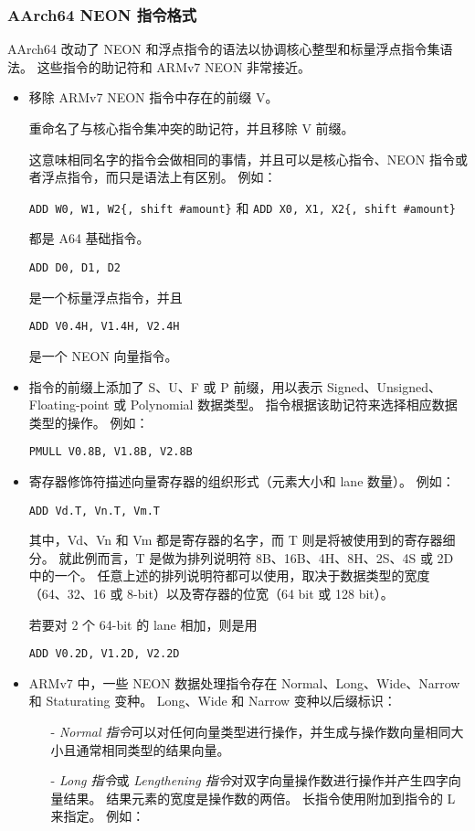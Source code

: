 \subsubsection{AArch64 NEON 指令格式}

AArch64 改动了 NEON 和浮点指令的语法以协调核心整型和标量浮点指令集语法。
这些指令的助记符和 ARMv7 NEON 非常接近。

\begin{itemize}
  \item 移除 ARMv7 NEON 指令中存在的前缀 V。

    重命名了与核心指令集冲突的助记符，并且移除 V 前缀。

    这意味相同名字的指令会做相同的事情，并且可以是核心指令、NEON 指令或者浮点指令，而只是语法上有区别。
    例如：

    \lstinline!ADD W0, W1, W2{, shift #amount}!
    和
    \lstinline!ADD X0, X1, X2{, shift #amount}!

    都是 A64 基础指令。

    \lstinline!ADD D0, D1, D2!

    是一个标量浮点指令，并且

    \lstinline!ADD V0.4H, V1.4H, V2.4H!

    是一个 NEON 向量指令。

  \item 指令的前缀上添加了 S、U、F 或 P 前缀，用以表示 Signed、Unsigned、Floating-point 或 Polynomial 数据类型。
    指令根据该助记符来选择相应数据类型的操作。
    例如：

    \lstinline!PMULL V0.8B, V1.8B, V2.8B!

  \item 寄存器修饰符描述向量寄存器的组织形式（元素大小和 lane 数量）。
    例如：

    \lstinline!ADD Vd.T, Vn.T, Vm.T!

    其中，Vd、Vn 和 Vm 都是寄存器的名字，而 T 则是将被使用到的寄存器细分。
    就此例而言，T 是做为排列说明符 8B、16B、4H、8H、2S、4S 或 2D 中的一个。
    任意上述的排列说明符都可以使用，取决于数据类型的宽度（64、32、16 或 8-bit）以及寄存器的位宽（64 bit 或 128 bit）。

    若要对 2 个 64-bit 的 lane 相加，则是用

    \lstinline!ADD V0.2D, V1.2D, V2.2D!

  \item ARMv7 中，一些 NEON 数据处理指令存在 Normal、Long、Wide、Narrow 和 Staturating 变种。
    Long、Wide 和 Narrow 变种以后缀标识：

    \begin{itemize}
      \item[-] \textit{Normal 指令}可以对任何向量类型进行操作，并生成与操作数向量相同大小且通常相同类型的结果向量。
      \item[-] \textit{Long 指令}或 \textit{Lengthening 指令}对双字向量操作数进行操作并产生四字向量结果。
        结果元素的宽度是操作数的两倍。
        长指令使用附加到指令的 L 来指定。
        例如：


\end{itemize}
\end{itemize}
